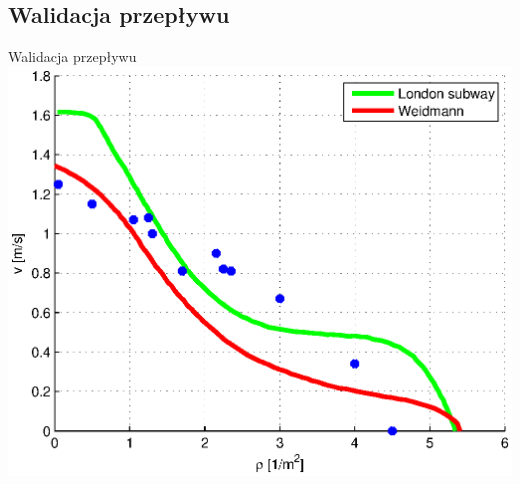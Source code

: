 \subsection{Walidacja przepływu}
\begin{frame}{Walidacja przepływu}
\includegraphics[width=\textwidth,height=0.8\textheight]{wykresy-weidmann_valid}
\end{frame}